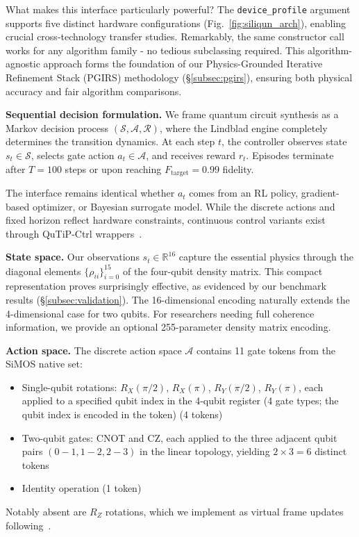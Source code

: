 What makes this interface particularly powerful? The \texttt{device\_profile} argument supports five distinct hardware configurations (Fig.~\ref{fig:siliqun_arch}), enabling crucial cross-technology transfer studies. Remarkably, the same constructor call works for any algorithm family - no tedious subclassing required. This algorithm-agnostic approach forms the foundation of our Physics-Grounded Iterative Refinement Stack (PGIRS) methodology (\S\ref{subsec:pgirs}), ensuring both physical accuracy and fair algorithm comparisons.

\textbf{Sequential decision formulation.}
We frame quantum circuit synthesis as a Markov decision process $(\mathcal{S}, \mathcal{A}, \mathcal{R})$, where the Lindblad engine completely determines the transition dynamics. At each step $t$, the controller observes state $s_t \in \mathcal{S}$, selects gate action $a_t \in \mathcal{A}$, and receives reward $r_t$. Episodes terminate after $T = 100$ steps or upon reaching $F_\text{target} = 0.99$ fidelity. 

The interface remains identical whether $a_t$ comes from an RL policy, gradient-based optimizer, or Bayesian surrogate model. While the discrete actions and fixed horizon reflect hardware constraints, continuous control variants exist through QuTiP-Ctrl wrappers~\cite{QuTiPCtrl2023}.

\textbf{State space.}
Our observations $s_t \in \mathbb{R}^{16}$ capture the essential physics through the diagonal elements $\{\rho_{ii}\}_{i=0}^{15}$ of the four-qubit density matrix. This compact representation proves surprisingly effective, as evidenced by our benchmark results (\S\ref{subsec:validation}). The 16-dimensional encoding naturally extends the 4-dimensional case for two qubits. For researchers needing full coherence information, we provide an optional 255-parameter density matrix encoding.

\textbf{Action space.}
The discrete action space $\mathcal{A}$ contains 11 gate tokens from the SiMOS native set:
\begin{itemize}
\item Single-qubit rotations: $R_X(\pi/2)$, $R_X(\pi)$, $R_Y(\pi/2)$, $R_Y(\pi)$, each applied to a specified qubit index in the 4-qubit register (4 gate types; the qubit index is encoded in the token) (4 tokens)
\item Two-qubit gates: CNOT and CZ, each applied to the three adjacent qubit pairs $(0{-}1, 1{-}2, 2{-}3)$ in the linear topology, yielding $2 \times 3 = 6$ distinct tokens
\item Identity operation (1 token)
\end{itemize}
Notably absent are $R_Z$ rotations, which we implement as virtual frame updates following~\cite{Veldhorst2015}.

